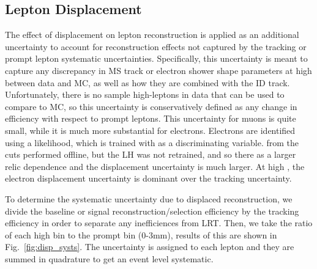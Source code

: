 \subsection{Lepton Displacement}

The effect of displacement on lepton reconstruction is applied as an additional uncertainty to account for reconstruction effects not captured by the tracking or prompt lepton systematic uncertainties. Specifically, this uncertainty is meant to capture any discrepancy in \ac{MS} track or electron shower shape parameters at high \absdz between data and MC, as well as how they are combined with the \ac{ID} track. Unfortunately, there is no sample high-\absdz leptons in data that can be used to compare to MC, so this uncertainty is conservatively defined as any change in efficiency with respect to prompt leptons. This uncertainty for muons is quite small, while it is much more substantial for electrons. Electrons are identified using a likelihood, which is trained with \dz as a discriminating variable. \absdz from the cuts performed offline, but the LH was not retrained, and so there as a larger relic \dz dependence and the displacement uncertainty is much larger. At high \absdz, the electron displacement uncertainty is dominant over the tracking uncertainty.

To determine the systematic uncertainty due to displaced reconstruction, we divide the baseline or signal reconstruction/selection efficiency by the tracking efficiency in order to separate any inefficiences from \ac{LRT}. Then, we take the ratio of each high \dz bin to the prompt bin (0-3mm), results of this are shown in Fig.~\ref{fig:disp_systs}. The uncertainty is assigned to each lepton and they are summed in quadrature to get an event level systematic. 


